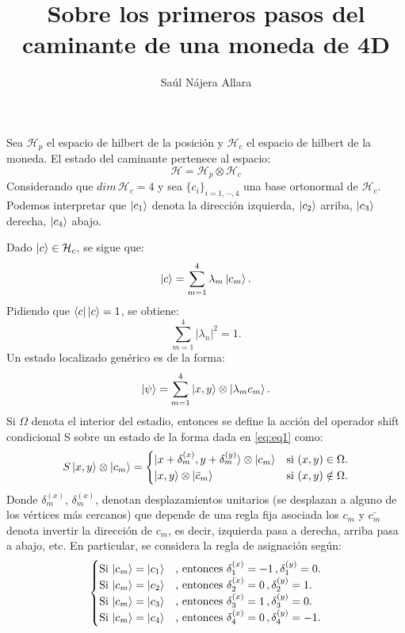 \documentclass[12pt]{article}
\title{Sobre los primeros pasos del caminante de una moneda de 4D}
\author{Saúl Nájera Allara}
\date{}
\begin{document}
\maketitle

Sea $\mathcal{H}_p$ el espacio de hilbert de la posición y $\mathcal{H}_c$ el espacio de hilbert de la moneda. El estado del caminante 
pertenece al espacio:
\begin{equation*}
\mathcal{H}=\mathcal{H}_p \otimes \mathcal{H}_c
\end{equation*}
Considerando que $dim\, \mathcal{H}_c=4$ y sea $\{c_i\}_{i=1,\cdots,4}$ una base ortonormal de $\mathcal{H}_c$.
Podemos interpretar que $\ket{c_1}$ denota la dirección izquierda, $\ket{c_2}$ arriba, $\ket{c_3}$ derecha, $\ket{c_4}$ abajo.

Dado $\ket{c}\in \mathcal{H}_c$, se sigue que:
\begin{equation*}
    \ket{c}=\sum_{m=1}^{4}\lambda_m \ket{c_m}.
\end{equation*}
Pidiendo que $\bra{c}\ket{c}=1$, se obtiene:
\begin{equation*}
    \sum_{m=1}^{4}|\lambda_n|^2=1.
\end{equation*}
Un estado localizado genérico es de la forma:
\begin{equation}
    \ket{\psi}=\sum_{m=1}^{4}\ket{x,y}\otimes\ket{\lambda_m c_m}.
    \label{eq:eq1}
\end{equation}
Si $\Omega$ denota el interior del estadio, entonces se define la acción del operador shift condicional S sobre un estado de la forma dada en \eqref{eq:eq1} como:
\begin{equation}
   S\ket{x,y}\otimes \ket{c_m}=
   \begin{cases}
        \ket{x+\delta_m^{(x)},y+\delta_m^{(y)}}\otimes \ket{c_m} & \text{si $(x,y)\in \Omega$}.
        \\
        \ket{x,y}\otimes \ket{\bar{c}_m} & \text{si $(x,y)\notin \Omega$}.
    \end{cases}
\end{equation}
Donde $\delta_m^{(x)}$, $\delta_m^{(x)}$, denotan desplazamientos unitarios (se desplazan a alguno de los vértices más cercanos) que depende de una regla fija asociada los $c_m$
y $\bar{c_m}$ denota invertir la dirección de $c_m$, es decir, izquierda pasa a derecha, arriba pasa a abajo, etc.
En particular, se considera la regla de asignación según:
\begin{equation*}
\begin{cases}
    \text{Si $\ket{c_m}=\ket{c_1}$} & \text{, entonces }\delta_1^{(x)}=-1\,,\delta_1^{(y)}=0. \\
     \text{Si $\ket{c_m}=\ket{c_2}$} & \text{, entonces }\delta_2^{(x)}=0\,,\delta_2^{(y)}=1. \\
      \text{Si $\ket{c_m}=\ket{c_3}$} & \text{, entonces }\delta_3^{(x)}=1\,,\delta_3^{(y)}=0. \\
       \text{Si $\ket{c_m}=\ket{c_4}$} & \text{, entonces }\delta_4^{(x)}=0\,,\delta_4^{(y)}=-1. \\
\end{cases}
\end{equation*}
\end{document}
